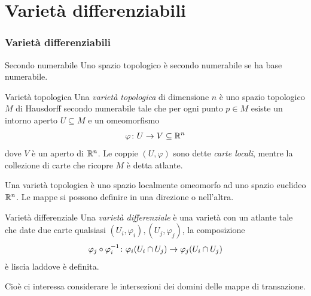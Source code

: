 \documentclass[a4paper]{article}
\begin{document}
\part{Varietà differenziabili}

\section{Varietà differenziabili}

\begin{snippetdefinition}{Secondo numerabile}
    Uno spazio topologico è secondo numerabile se ha base numerabile.
\end{snippetdefinition}

\begin{snippetdefinition}{Varietà topologica}
    Una \emph{varietà topologica} di dimensione \(n\)
    è uno spazio topologico \(M\)
    di Hausdorff secondo numerabile tale che per ogni punto
    \(p \in M\) esiste un intorno aperto \(U \subseteq M\)
    e un omeomorfismo
    \[
        \varphi \colon U \to V \subseteq \mathbb{R}^n
    \]
    dove \(V\) è un aperto di \(\mathbb{R}^n\).
    Le coppie \((U, \varphi)\) sono dette \emph{carte locali},
    mentre la collezione di carte che ricopre \(M\) è detta atlante.
\end{snippetdefinition}

Una varietà topologica è uno spazio localmente omeomorfo ad uno spazio euclideo
\(\mathbb{R}^n\). Le mappe si possono definire in una direzione o nell'altra.

\begin{snippetdefinition}{Varietà differenziale}
    Una \emph{varietà differenziale} è una varietà
    con un atlante tale che date due carte qualsiasi \((U_i, \varphi_i), (U_j, \varphi_j)\),
    la composizione
    \[
        \varphi_j \circ \varphi_i^{-1} \colon \varphi_i(U_i \cap U_j) \to \varphi_j(U_i \cap U_j)
    \]
    è liscia laddove è definita.
\end{snippetdefinition}

Cioè ci interessa considerare le intersezioni dei domini delle mappe di transazione.
\end{document}
